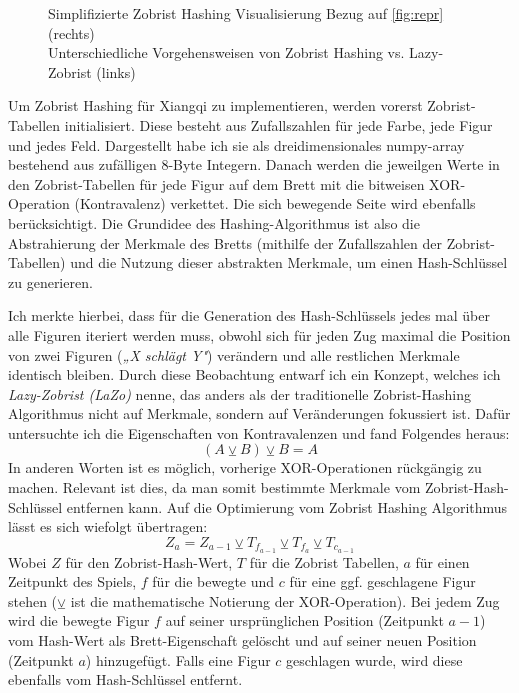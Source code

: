 \documentclass[
  manuscript=article,  %
  layout=publish,  %
  year=2023,
  volume=1,
]{extra/joas}
\begin{document}
\begin{figure}
\begin{minipage}{0.49\textwidth}
    \end{minipage}
    \captionsetup{justification=centering}
    \caption{Simplifizierte Zobrist Hashing Visualisierung Bezug auf \ref{fig:repr} (rechts) \\ Unterschiedliche Vorgehensweisen von Zobrist Hashing vs. Lazy-Zobrist (links)}
    \label{fig:zobristVisLaZo}
  \end{figure}
  
Um Zobrist Hashing für Xiangqi zu implementieren, werden vorerst Zobrist-Tabellen initialisiert. Diese besteht aus Zufallszahlen für jede Farbe, jede Figur und jedes Feld. Dargestellt habe ich sie als dreidimensionales numpy-array bestehend aus zufälligen 8-Byte Integern. 
Danach werden die jeweilgen Werte in den Zobrist-Tabellen für jede Figur auf dem Brett mit die bitweisen XOR-Operation (Kontravalenz) verkettet. Die sich bewegende Seite wird ebenfalls berücksichtigt.
Die Grundidee des Hashing-Algorithmus ist also die Abstrahierung der Merkmale des Bretts (mithilfe der Zufallszahlen der Zobrist-Tabellen) und die Nutzung dieser abstrakten Merkmale, um einen Hash-Schlüssel zu generieren.
  
Ich merkte hierbei, dass für die Generation des Hash-Schlüssels jedes mal über alle Figuren iteriert werden muss, obwohl sich für jeden Zug maximal die Position von zwei Figuren (\textit{„X schlägt Y"}) verändern und alle restlichen Merkmale identisch bleiben. Durch diese Beobachtung entwarf ich ein Konzept, welches ich \textit{Lazy-Zobrist (LaZo)} nenne, das anders als der traditionelle Zobrist-Hashing Algorithmus nicht auf Merkmale, sondern auf Veränderungen fokussiert ist. 
Dafür untersuchte ich die Eigenschaften von Kontravalenzen und fand Folgendes heraus:
\begin{equation}
    (A\veebar B) \veebar B = A
\end{equation}
In anderen Worten ist es möglich, vorherige XOR-Operationen rückgängig zu machen. Relevant ist dies, da man somit bestimmte Merkmale vom Zobrist-Hash-Schlüssel entfernen kann. Auf die Optimierung vom Zobrist Hashing Algorithmus lässt es sich wiefolgt übertragen:
\begin{equation}
    Z_a = Z_{a-1} \veebar T_{f_{a-1}} \veebar T_{f_a} \veebar T_{c_{a-1}}
\end{equation}
Wobei $Z$  für den Zobrist-Hash-Wert, $T$ für die Zobrist Tabellen, $a$ für einen Zeitpunkt des Spiels, $f$ für die bewegte und $c$ für eine ggf. geschlagene Figur stehen ($\veebar$ ist die mathematische Notierung der XOR-Operation). Bei jedem Zug wird die bewegte Figur $f$ auf seiner ursprünglichen Position (Zeitpunkt $a-1$) vom Hash-Wert als Brett-Eigenschaft gelöscht und auf seiner neuen Position (Zeitpunkt $a$) hinzugefügt. Falls eine Figur $c$ geschlagen wurde, wird diese ebenfalls vom Hash-Schlüssel entfernt.
\end{document}
